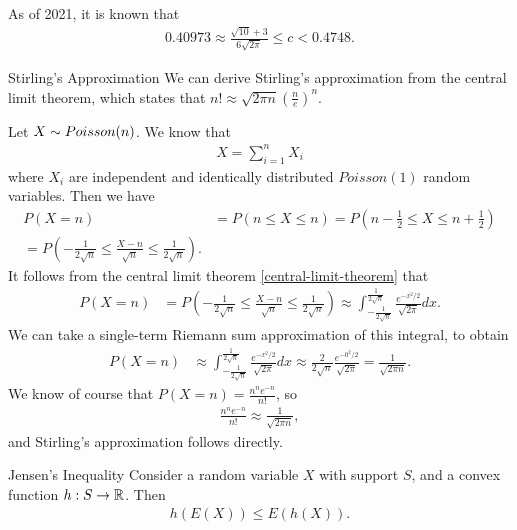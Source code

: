 \begin{rmk}
    As of 2021, it is known that
    \begin{align*}
        0.40973 \approx \frac{\sqrt{10}+3}{6\sqrt{2\pi}} \leq c < 0.4748.
    \end{align*}
\end{rmk}

\begin{exmp}{Stirling's Approximation}\proofbreak
    We can derive Stirling's approximation from the central limit theorem, which states that $n! \approx \sqrt{2\pi n}\left(\frac{n}{e}\right)^n$.

    Let $X \sim Poisson(n)$. We know that
    \begin{align*}
        X = \sum_{i=1}^{n}X_i
    \end{align*}
    where $X_i$ are independent and identically distributed $Poisson(1)$ random variables. Then we have
    \begin{align*}
        P(X = n) &= P(n \leq X \leq n) = P\left(n-\frac{1}{2} \leq X \leq n + \frac{1}{2}\right) \\
        = P\left(-\frac{1}{2\sqrt{n}} \leq \frac{X-n}{\sqrt{n}} \leq \frac{1}{2\sqrt{n}}\right).
    \end{align*}
    It follows from the central limit theorem \ref{central-limit-theorem} that
    \begin{align*}
        P(X = n) &= P\left(-\frac{1}{2\sqrt{n}} \leq \frac{X-n}{\sqrt{n}} \leq \frac{1}{2\sqrt{n}}\right) \approx \int_{-\frac{1}{2\sqrt{n}}}^{\frac{1}{2\sqrt{n}}}\frac{e^{-x^2/2}}{\sqrt{2\pi}}dx.
    \end{align*}
    We can take a single-term Riemann sum approximation of this integral, to obtain
    \begin{align*}
        P(X = n) &\approx \int_{-\frac{1}{2\sqrt{n}}}^{\frac{1}{2\sqrt{n}}}\frac{e^{-x^2/2}}{\sqrt{2\pi}}dx \approx \frac{2}{2\sqrt{n}}\frac{e^{-0^2/2}}{\sqrt{2\pi}} = \frac{1}{\sqrt{2\pi n}}.
    \end{align*}
    We know of course that $P(X = n) = \frac{{n^n}e^{-n}}{n!}$, so
    \begin{align*}
        \frac{{n^n}e^{-n}}{n!} \approx \frac{1}{\sqrt{2\pi n}},
    \end{align*}
    and Stirling's approximation follows directly.
\end{exmp}

\begin{prop}{Jensen's Inequality}\label{jensen-inequality}\proofbreak
    Consider a random variable $X$ with support $S$, and a convex function $h: S \to \mathbb{R}$. Then
    \begin{align*}
        h\left(E(X)\right) \leq E\left(h(X)\right).
    \end{align*}
\end{prop}

